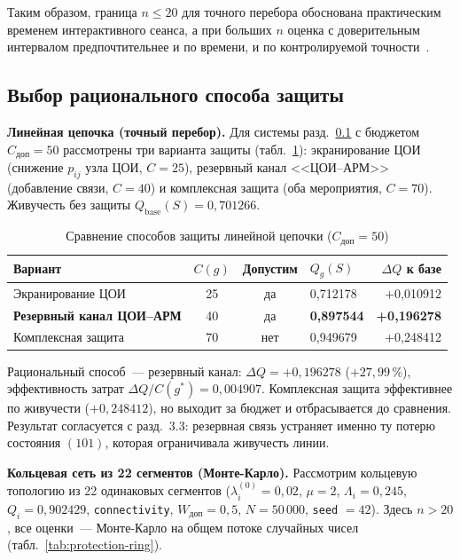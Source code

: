 \documentclass[12pt]{article}
\begin{document}
Таким образом, граница $n \leq 20$ для точного перебора обоснована
практическим временем интерактивного сеанса, а при больших $n$ оценка с
доверительным интервалом предпочтительнее и по времени, и по контролируемой
точности~\cite{metropolis,cramer}.

\subsection{Выбор рационального способа защиты}
\label{sec:protection-line}

\textbf{Линейная цепочка (точный перебор).} Для системы
разд.~\ref{sec:protection-line} с бюджетом $C_{\text{доп}} = 50$ рассмотрены
три варианта защиты (табл.~\ref{tab:protection-line}): экранирование ЦОИ
(снижение $p_{ij}$ узла ЦОИ, $C = 25$), резервный канал <<ЦОИ--АРМ>>
(добавление связи, $C = 40$) и комплексная защита (оба мероприятия,
$C = 70$). Живучесть без защиты $Q_{\text{base}}(S) = 0{,}701266$.

\begin{table}[htb]
\centering
\caption{Сравнение способов защиты линейной цепочки ($C_{\text{доп}} = 50$)}
\label{tab:protection-line}
\begin{tabular}{@{}lcclr@{}}
\toprule
Вариант & $C(g)$ & Допустим & $Q_g(S)$ & $\Delta Q$ к базе \\
\midrule
Экранирование ЦОИ & 25 & да & 0{,}712178 & +0{,}010912 \\
\textbf{Резервный канал ЦОИ--АРМ} & 40 & да &
\textbf{0{,}897544} & \textbf{+0{,}196278} \\
Комплексная защита & 70 & нет & 0{,}949679 & +0{,}248412 \\
\bottomrule
\end{tabular}
\end{table}

Рациональный способ~--- резервный канал: $\Delta Q = +0{,}196278$
($+27{,}99\,\%$), эффективность затрат $\Delta Q / C(g^{*}) = 0{,}004907$.
Комплексная защита эффективнее по живучести ($+0{,}248412$), но выходит за
бюджет и отбрасывается до сравнения. Результат согласуется с
разд.~3.3: резервная связь устраняет именно ту потерю состояния $(101)$,
которая ограничивала живучесть линии.

\textbf{Кольцевая сеть из 22 сегментов (Монте-Карло).} Рассмотрим
кольцевую топологию из 22 одинаковых сегментов ($\lambda_i^{(0)} =
0{,}02$, $\mu = 2$, $\Lambda_i = 0{,}245$, $Q_i = 0{,}902429$,
\texttt{connectivity}, $W_{\text{доп}} = 0{,}5$, $N = 50\,000$,
\texttt{seed} $= 42$). Здесь $n > 20$, все оценки~--- Монте-Карло на
общем потоке случайных чисел (табл.~\ref{tab:protection-ring}).
\end{document}
